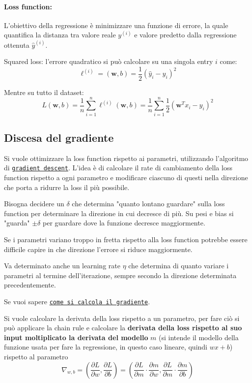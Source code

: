 \paragraph{Loss function:} L'obiettivo della regressione è minimizzare una funzione di errore, la quale quantifica la distanza tra valore reale $y^{(i)}$ e valore predetto dalla regressione ottenuta $\hat y^{(i)}$.

Squared loss: l'errore quadratico si può calcolare su una singola entry $i$ come:
$$ \ell^{(i)} = (\bm w, b) = \frac{1}{2}  \left(\hat y_i - y_i\right)^2 $$

Mentre su tutto il dataset:
$$ L (\bm w, b) = \frac{1}{n} \sum_{i=1}^{n} \ell^{(i)} (\bm w, b) = \frac{1}{n} \sum_{i=1}^{n} \frac{1}{2} \left(\bm w^T x_i - y_i \right)^2 $$


\subsection{Discesa del gradiente}

Si vuole ottimizzare la loss function rispetto ai parametri, utilizzando l'algoritmo di \href{https://it.wikipedia.org/wiki/Discesa_del_gradiente}{\texttt{gradient descent}}. L'idea è di calcolare il rate di cambiamento della loss function rispetto a ogni parametro e modificare ciascuno di questi nella direzione che porta a ridurre la loss il più possibile.

Bisogna decidere un $\delta$ che determina "quanto lontano guardare" sulla loss function per determinare la direzione in cui decresce di più. Su pesi e bias si "guarda" $\pm \delta$ per guardare dove la funzione decresce maggiormente.

Se i parametri variano troppo in fretta rispetto alla loss function potrebbe essere difficile capire in che direzione l'errore si riduce maggiormente.

Va determinato anche un learning rate $\eta$ che determina di quanto variare i parametri al termine dell'iterazione, sempre secondo la direzione determinata precedentemente.

Se vuoi sapere \href{https://it.wikipedia.org/wiki/Gradiente}{\texttt{come si calcola il gradiente}}.

Si vuole calcolare la derivata della loss rispetto a un parametro, per fare ciò si può applicare la chain rule e calcolare la \textbf{derivata della loss rispetto al suo input moltiplicato la derivata del modello} $m$ (si intende il modello della funzione usata per fare la regressione, in questo caso lineare, quindi $wx + b$) rispetto al parametro
$$ \nabla_{w,b} = \left( \frac{\partial L}{\partial w}, \frac{\partial L}{\partial b}\right) = \left(\frac{\partial L}{\partial m} \cdot \frac{\partial m}{\partial w}, \frac{\partial L}{\partial m} \cdot \frac{\partial m}{\partial b}\right) $$

